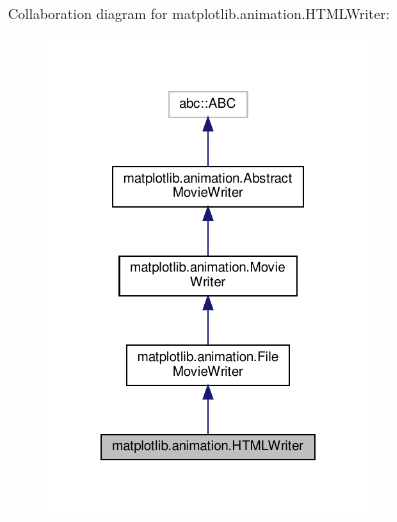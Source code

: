 Collaboration diagram for matplotlib.\+animation.\+H\+T\+M\+L\+Writer\+:
\nopagebreak
\begin{figure}[H]
\begin{center}
\leavevmode
\includegraphics[width=240pt]{classmatplotlib_1_1animation_1_1HTMLWriter__coll__graph}
\end{center}
\end{figure}
